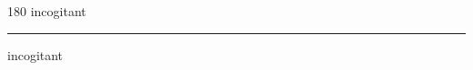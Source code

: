 
\begin{frame}
\begin{center}
\begin{turn}{180}
{\fontsize{2.5cm}{1em}\selectfont incogitant}
\end{turn}
\vspace{1em}\par  
\hrule
\vspace{1em}\par  
{\fontsize{2.5cm}{1em}\selectfont incogitant}
\end{center}
\end{frame}
